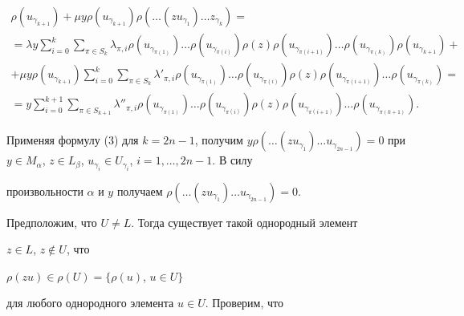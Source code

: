 \begin{pf}
\begin{multline*}
\rho(u_{\gamma_{k+1}})+\mu y\rho(u_{\gamma_{k+1}}) 


\rho(\dotsc(z u_{\gamma_1})\dotsc z_{\gamma_k})= \\ 


% 


=\lambda y\sum^k_{i=0}\sum_{\pi\in S_k}\lambda_{\pi,i} 


\rho(u_{\gamma_{\pi(1)}})\dotsc \rho(u_{\gamma_{\pi(i)}})\rho(z) 


\rho(u_{\gamma_{\pi(i+1)}})\dotsc \rho(u_{\gamma_{\pi(k)}}) 


\rho(u_{\gamma_{k+1}}) + \\ 


% 


+\mu y\rho(u_{\gamma_{k+1}})\sum^k_{i=0}\sum_{\pi\in S_k} 


\lambda'_{\pi,i}\rho(u_{\gamma_{\pi(1)}})\dotsc 


\rho(u_{\gamma_{\pi(i)}})\rho(z)\rho(u_{\gamma_{\pi(i+1)}}) 


\dotsc \rho(u_{\gamma_{\pi(k)}})= \\ 


% 


=y\sum^{k+1}_{i=0}\sum_{\pi\in S_{k+1}}\lambda''_{\pi,i} 


\rho(u_{\gamma_{\pi(1)}})\dotsc \rho(u_{\gamma_{\pi(i)}}) 


\rho(z) \rho(u_{\gamma_{\pi(i+1)}})\dotsc 


\rho(u_{\gamma_{\pi(k+1)}}). 


\end{multline*} 


Применяя формулу (3) для $k=2n-1$, получим $y\rho(\dotsc (z 


u_{\gamma_1})\dotsc u_{\gamma_{2n-1}})=0$ при $y\in M_\alpha$, $z\in 


L_\beta$, $u_{\gamma_i}\in U_{\gamma_i}$, $i=1,\dotsc,2n-1$. В силу 


произвольности $\alpha$ и $y$ получаем $\rho(\dotsc(z 


u_{\gamma_1})\dotsc u_{\gamma_{2n-1}})=0$. 


 


Предположим, что $U\ne L$. Тогда существует такой однородный элемент 


$z\in L$, $z\notin U$, что


$\rho(z u)\in \rho(U)=\{\rho(u)$, $u\in U\}$


для любого однородного элемента $u\in U$. Проверим, что 



\end{pf}
